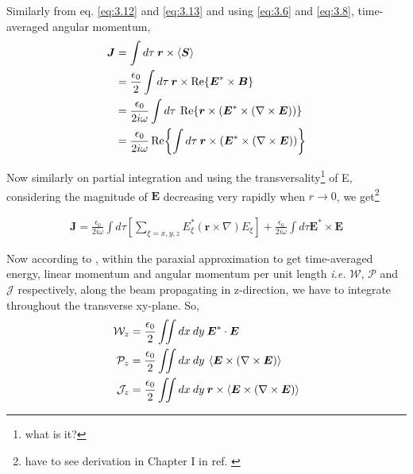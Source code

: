 \documentclass[11pt,a4paper]{article}
\numberwithin{equation}{section}
\begin{document}
Similarly from eq. \ref{eq:3.12} and \ref{eq:3.13} and using \ref{eq:3.6} and \ref{eq:3.8}, time-averaged angular momentum, 
\begin{align}
	\boldsymbol{J} &= \int d\tau\: \boldsymbol{r}\times\expval{\boldsymbol{S}}\\
	&=\frac{\epsilon_0}{2}\int d\tau \:\boldsymbol{r}\times\Re{\boldsymbol{E}^\ast \times \boldsymbol{B}}\nonumber\\
	&= \frac{\epsilon_0}{2i\omega}\int d\tau\: \Re{\boldsymbol{r}\times\left(\boldsymbol{E}^\ast \times (\nabla\times\boldsymbol{E})\right)}\nonumber\\
	&=\frac{\epsilon_0}{2i\omega}\Re{\int d\tau\: \boldsymbol{r}\times\left(\boldsymbol{E}^\ast \times (\nabla\times\boldsymbol{E})\right)}
\end{align}

Now similarly on partial integration and using the transversality\footnote{what is it?} of E, considering the magnitude of $\boldsymbol{E}$ decreasing very rapidly when $r\to0$, \cite{enk nien 92}\cite{allen 99} we get\footnote{have to see derivation in Chapter I in ref. \cite{CCT}}

\begin{align}
	 \boldsymbol{J}=\frac{\epsilon_0}{2i\omega}\int d\tau \left[\sum_{\xi=x,y,z}E_\xi^\ast(\boldsymbol{r}\times\nabla)E_\xi\right]+ \frac{\epsilon_0}{2i\omega}\int d\tau \boldsymbol{E}^\ast\times \boldsymbol{E}
\end{align}

Now according to \cite{bernatt allen 94}\cite{enk nien 92}, within the paraxial approximation to get time-averaged energy, linear momentum and angular momentum per unit length \textit{i.e.} $\mathcal{W}$, $\mathcal{P}$ and $\mathcal{J}$ respectively, along the beam propagating in z-direction, we have to integrate throughout the transverse xy-plane. So,
\begin{align}
	\mathcal{W}_z&=\frac{\epsilon_0}{2}\iint dx\:dy\: \boldsymbol{E}^\ast\cdot\boldsymbol{E}\label{eq:3.17}\\
	\mathcal{P}_z&=\frac{\epsilon_0}{2}\iint  dx\:dy\: \expval{\boldsymbol{E}\times (\nabla\times\boldsymbol{E})}\\
	\mathcal{J}_z&=\frac{\epsilon_0}{2}\iint dx\:dy\: \boldsymbol{r}\times\expval{\boldsymbol{E}\times (\nabla\times\boldsymbol{E})}
	\label{eq:3.19}
\end{align}
\end{document}
